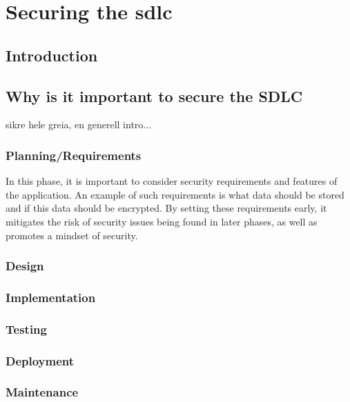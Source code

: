 
\section{Securing the \acrshort{sdlc}}

\subsection{Introduction}

\subsection{Why is it important to secure the SDLC}
sikre hele greia, en generell intro...

\subsubsection{Planning/Requirements}
In this phase, it is important to consider security requirements and features of the application. An example of such requirements is what data should be stored and if this data should be encrypted. By setting these requirements early, it mitigates the risk of security issues being found in later phases, as well as promotes a mindset of security. \cite{securerequirements}
\subsubsection{Design}

\subsubsection{Implementation}
\subsubsection{Testing}
\subsubsection{Deployment}
\subsubsection{Maintenance}